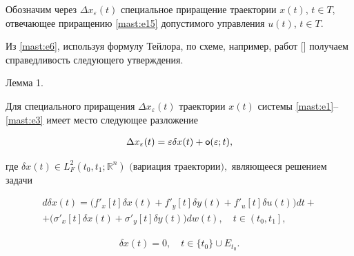 Обозначим через $ \Delta x_{\varepsilon}(t) $ специальное приращение траектории $ x(t) $, $ t{\in T }$, отвечающее приращению \eqref{mast:e15} допустимого управления $ u(t) $, $ t\in T $.  

Из \eqref{mast:e6}, используя формулу Тейлора, по схеме, например, работ [] получаем справедливость  следующего утверждения.



\smallskip



{\small \sc Лемма 1.} \it

Для специального приращения $ \Delta x_{\varepsilon}(t) $ траектории $ x(t) $  системы \eqref{mast:e1}--\eqref{mast:e3} имеет место следующее разложение

\begin{gather}

\Delta x_{\varepsilon}(t)=\varepsilon  \delta x(t)+ {\sf o} (\varepsilon ;  t),

 \label{mast:e16}

\end{gather}

где $ \delta x(t)\in L^{2}_{F}(t_{0}, t_{1}; \mathbb R^{n}) $ $($вариация траектории$),$ являющееся решением задачи

\begin{multline}

d\delta x(t)= \bigl(

f'_{x}[t] \delta x(t)+f'_{y}[t] \delta y(t)+f'_{u}[t] \delta u(t)\bigr)dt

+

\\

+\bigl( \sigma'_{x}[t] \delta x(t)+\sigma'_{y}[t] \delta y(t) \bigr) dw (t), \quad t\in \left( t_{0}, t_{1} \right] , 

\end{multline}

\begin{gather}

 \delta x(t)=0, \quad t\in\lbrace t_{0} \rbrace \cup E_{t_{0}}.

  \label{mast:e17}

\end{gather}



\rm





\smallskip





